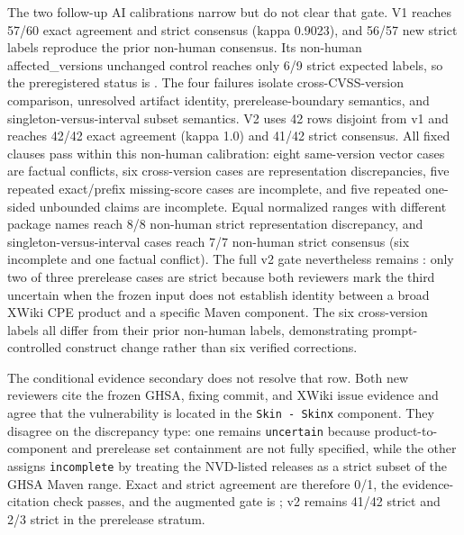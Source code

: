 The two follow-up AI calibrations narrow but do not clear that gate. V1 reaches 57/60 exact agreement and strict consensus (kappa 0.9023), and 56/57 new strict labels reproduce the prior non-human consensus. Its non-human affected\_versions unchanged control reaches only 6/9 strict expected labels, so the preregistered status is . The four failures isolate cross-CVSS-version comparison, unresolved artifact identity, prerelease-boundary semantics, and singleton-versus-interval subset semantics. V2 uses 42 rows disjoint from v1 and reaches 42/42 exact agreement (kappa 1.0) and 41/42 strict consensus. All fixed clauses pass within this non-human calibration: eight same-version vector cases are factual conflicts, six cross-version cases are representation discrepancies, five repeated exact/prefix missing-score cases are incomplete, and five repeated one-sided unbounded claims are incomplete. Equal normalized ranges with different package names reach 8/8 non-human strict representation discrepancy, and singleton-versus-interval cases reach 7/7 non-human strict consensus (six incomplete and one factual conflict). The full v2 gate nevertheless remains : only two of three prerelease cases are strict because both reviewers mark the third uncertain when the frozen input does not establish identity between a broad XWiki CPE product and a specific Maven component. The six cross-version labels all differ from their prior non-human labels, demonstrating prompt-controlled construct change rather than six verified corrections.

The conditional evidence secondary does not resolve that row. Both new reviewers cite the frozen GHSA, fixing commit, and XWiki issue evidence and agree that the vulnerability is located in the \texttt{Skin - Skinx} component. They disagree on the discrepancy type: one remains \texttt{uncertain} because product-to-component and prerelease set containment are not fully specified, while the other assigns \texttt{incomplete} by treating the NVD-listed releases as a strict subset of the GHSA Maven range. Exact and strict agreement are therefore 0/1, the evidence-citation check passes, and the augmented gate is ; v2 remains 41/42 strict and 2/3 strict in the prerelease stratum.

